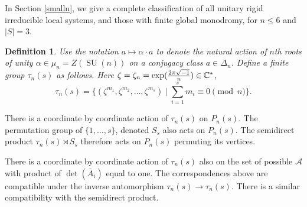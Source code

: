 \documentclass[11pt]{amsart}
\newcommand\op{\operatorname}
\newtheorem{remark}[theorem]{ Remark}
\newtheorem{defi}[theorem]{Definition}
\numberwithin{theorem}{subsection}
\begin{document}
In Section \ref{smalln}, we give a complete classification of all unitary rigid irreducible local systems, and those with finite global monodromy,  for $n\leq 6$ and $|S|=3$.

\begin{defi}\label{symmetry}
 Use the notation $a\mapsto \alpha\cdot a$ to denote the natural action of $n$th roots of unity $\alpha\in\mu_n=Z(\op{SU}(n))$ on a conjugacy class $a\in \Delta_n$. Define a finite group $\tau_n(s)$ as follows. Here $\zeta=\zeta_n=\exp(\frac{2\pi\sqrt{-1}}{n})\in \Bbb{C}^*$,
$$\tau_n(s)=\{(\zeta^{m_1},\zeta^{m_2},\dots,\zeta^{m_s})\mid \sum_{i=1}^s m_i\equiv 0 \pmod{n}\}.$$
\end{defi}
There is a coordinate by coordinate action of $\tau_n(s)$ on $P_n(s)$. The permutation group of $\{1,\dots,s\}$, denoted $S_s$ also acts on $P_n(s)$. The semidirect product $\tau_n(s)\rtimes S_s$ therefore acts on $P_n(s)$ permuting its vertices.

There is a coordinate by coordinate action of $\tau_n(s)$ also on the set of possible $\mathcal{A}$ with product of $\det(\bar{A}_i)$ equal to one. The correspondences above are compatible under the inverse automorphism $\tau_n(s)\to \tau_n(s)$. There is a similar compatibility  with the semidirect product.
\end{document}
